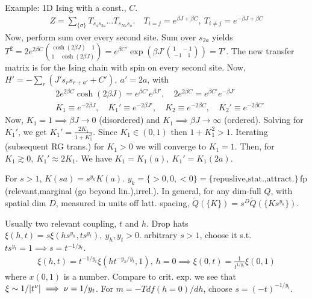 \documentclass[a4paper, english, 12pt]{article}
\newcommand{\closed}[1]{\left( #1 \right)}
\newcommand{\curly}[1]{\{ #1 \} }
\begin{document}
\begin{multicols*}{2}
Example: 1D Ising with a const., $C$. 
\begin{align*}
    Z = \sum_{\curly{\sigma}} T_{s_a s_{2a}}\dots T_{s_{Na} s_a}. \quad T_{i=j}=e^{\beta J + \beta C},\:T_{i\neq j}=e^{-\beta J +\beta C}
\end{align*}
Now, perform sum over every second site. Sum over $s_{2a}$ yields $T^2=2e^{2\beta C} \binom{\cosh(2\beta J)\quad 1}{1\quad \cosh(2\beta J)}=e^{\beta C'} \exp\closed{\beta J'\binom{1 \quad -1}{-1 \quad 1}}=T'$. The new transfer matrix is for the Ising chain with spin on every second site. Now, $H'=-\sum_r (J' s_r s_{r+a'}+C'),\:a'=2a$, with 
\begin{align*}
    &2e^{2\beta C} \cosh(2\beta J) = e^{\beta C'} e^{\beta J'},\quad 2e^{2\beta C}=e^{\beta C'} e^{-\beta J'} \\ 
    &K_1 \equiv e^{-2\beta J},\quad K_1' \equiv e^{-2\beta J'},\quad K_2 \equiv e^{-2\beta C},\quad K_2' \equiv e^{-2\beta C'}
\end{align*} 
Now, $K_1=1\implies \beta J\to 0$ (disordered) and $K_1\implies \beta J\to\infty$ (ordered). Solving for $K_1'$, we get $K_1'=\frac{2K_1}{1+K_1^2}$. Since $K_1\in(0,1)$ then $1+K_1^2>1$. Iterating (subsequent RG trans.) for $K_1>0$ we will converge to $K_1=1$. Then, for $K_1\gtrsim0,\:K_1'\approx 2K_1$. We have $K_1=K_1(a),\: K_1'=K_1(2a)$. 

For $s>1$, $K(sa)=s^{y_k} K(a)$. $y_k=\{ >0,0,<0\}=\{\text{repuslive,stat.,attract.}\}\,\text{fp}$ (relevant,marginal (go beyond lin.),irrel.). In general, for any dim-full $Q$, with spatial dim $D$, measured in units off latt. spacing, $\boxed{\tilde{Q}(\curly{K})=s^D \tilde{Q}(\curly{K s^{y_k}})}$.

Usually two relevant coupling, $t$ and $h$. Drop hats $\xi(h,t) = s \xi(hs^{y_h},ts^{y_t}),\:y_h,y_t>0$. arbitrary $s>1$, choose it s.t. $ts^{y_t}=1\implies s=t^{-1/y_t}$. 
\begin{align*}
    \xi(h,t) = t^{-1/y_t} \xi(ht^{-y_h / y_t},1),\:h=0\implies \xi(0,t) = \frac{1}{t^{1/y_t}} \xi(0,1)
\end{align*}
where $x(0,1)$ is a number. Compare to crit. exp. we see that $\xi\sim 1/\abs{t^\nu}\implies \nu=1/y_t$. For $m=-T df(h=0)/dh$, choose $s=(-t)^{-1/y_t}$. 


\end{multicols*}
\end{document}
